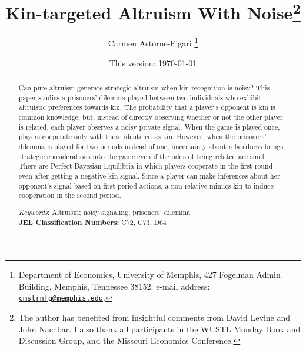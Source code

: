 \documentclass[12pt]{article}
\title{Kin-targeted Altruism With Noise\thanks{The author has benefited from insightful comments from David Levine and John Nachbar. I also thank all participants in the WUSTL Monday Book and Discussion Group, and the Missouri Economics Conference.}}
\author{Carmen Astorne-Figari \thanks{Department of Economics, University of Memphis, 427 Fogelman Admin Building, Memphis, Tennessee 38152;  e-mail address: \href{mailto:cmstrnfg@memphis.edu}{\tt cmstrnfg@memphis.edu}.}}
\date{This version: \today}
\begin{document}
\maketitle
\begin{abstract}
\thispagestyle{empty}
\bigskip
Can pure altruism generate strategic altruism when kin recognition is noisy? This paper studies a prisoners' dilemma played between two individuals who exhibit altruistic preferences towards kin. The probability that a player's opponent is kin is common knowledge, but, instead of directly observing whether or not the other player is related, each player observes a noisy private signal. When the game is played once, players cooperate only with those identified as kin. However, when the prisoners' dilemma is played for two periods instead of one, uncertainty about relatedness brings strategic considerations into the game even if the odds of being related are small. There are Perfect Bayesian Equilibria in which players cooperate in the first round even after getting a negative kin signal. Since a player can make inferences about her opponent's signal based on first period actions, a non-relative mimics kin to induce cooperation in the second period.
\\
\bigskip \bigskip

\noindent \textit{Keywords}: Altruism; noisy signaling; prisoners' dilemma\\

\noindent \textbf{JEL Classification Numbers:} C72, C73, D64
\end{abstract}

\newpage
\end{document}
